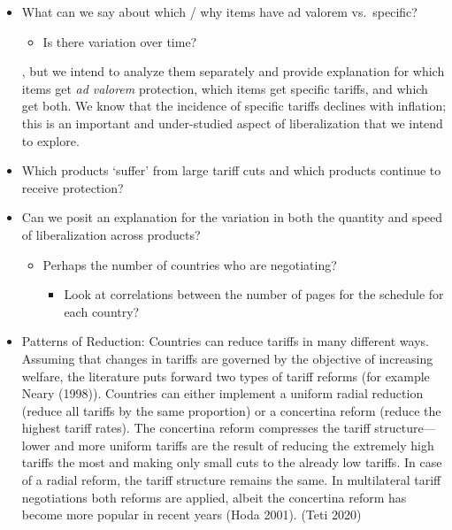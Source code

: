 \documentclass[
  12pt,
]{article}
\providecommand{\tightlist}{%
  \setlength{\itemsep}{0pt}\setlength{\parskip}{0pt}}
\begin{document}
\begin{itemize}
\item
  What can we say about which / why items have ad valorem vs.~specific?

  \begin{itemize}
  \tightlist
  \item
    Is there variation over time?
  \end{itemize}

  , but we intend to analyze them separately and provide explanation for which items get \emph{ad valorem} protection, which items get specific tariffs, and which get both. We know that the incidence of specific tariffs declines with inflation; this is an important and under-studied aspect of liberalization that we intend to explore.
\item
  Which products `suffer' from large tariff cuts and which products continue to receive protection?
\item
  Can we posit an explanation for the variation in both the quantity and speed of liberalization across products?

  \begin{itemize}
  \item
    Perhaps the number of countries who are negotiating?

    \begin{itemize}
    \tightlist
    \item
      Look at correlations between the number of pages for the schedule for each country?
    \end{itemize}
  \end{itemize}
\item
  Patterns of Reduction: Countries can reduce tariffs in many different ways. Assuming that changes in tariffs are governed by the objective of increasing welfare, the literature puts forward two types of tariff reforms (for example Neary (1998)). Countries can either implement a uniform radial reduction (reduce all tariffs by the same proportion) or a concertina reform (reduce the highest tariff rates). The concertina reform compresses the tariff structure---lower and more uniform tariffs are the result of reducing the extremely high tariffs the most and making only small cuts to the already low tariffs. In case of a radial reform, the tariff structure remains the same. In multilateral tariff negotiations both reforms are applied, albeit the concertina reform has become more popular in recent years (Hoda 2001). (Teti 2020)
\end{itemize}
\end{document}
